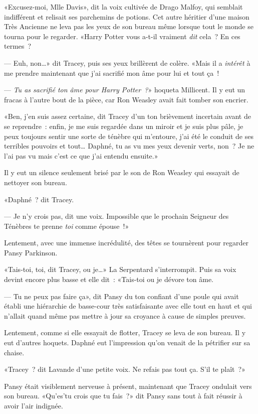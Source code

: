 «Excusez-moi, Mlle Davis», dit la voix cultivée de Drago Malfoy, qui semblait indifférent et relisait ses parchemins de potions. Cet autre héritier d'une maison Très Ancienne ne leva pas les yeux de son bureau même lorsque tout le monde se tourna pour le regarder. «Harry Potter vous a-t-il vraiment \emph{dit} cela~? En ces termes~?

--- Euh, non…» dit Tracey, puis ses yeux brillèrent de colère. «Mais il a \emph{intérêt} à me prendre maintenant que j'ai sacrifié mon âme pour lui et tout ça~!

--- \emph{Tu as sacrifié ton âme pour Harry Potter~?}» hoqueta Millicent. Il y eut un fracas à l'autre bout de la pièce, car Ron Weasley avait fait tomber son encrier.

«Ben, j'en suis assez certaine, dit Tracey d'un ton brièvement incertain avant de se reprendre~: enfin, je me suis regardée dans un miroir et je suis plus pâle, je peux toujours sentir une sorte de ténèbre qui m'entoure, j'ai été le conduit de ses terribles pouvoirs et tout… Daphné, tu as vu mes yeux devenir verts, non~? Je ne l'ai pas vu mais c'est ce que j'ai entendu ensuite.»

Il y eut un silence seulement brisé par le son de Ron Weasley qui essayait de nettoyer son bureau.

«Daphné~? dit Tracey.

--- Je n'y crois pas, dit une voix. Impossible que le prochain Seigneur des Ténèbres te prenne \emph{toi} comme épouse~!»

Lentement, avec une immense incrédulité, des têtes se tournèrent pour regarder Pansy Parkinson.

«Tais-toi, toi, dit Tracey, ou je…» La Serpentard s'interrompit. Puis sa voix devint encore plus basse et elle dit~: «Tais-toi ou je dévore ton âme.

--- Tu ne peux pas faire ça», dit Pansy du ton confiant d'une poule qui avait établi une hiérarchie de basse-cour très satisfaisante avec elle tout en haut et qui n'allait quand même pas mettre à jour sa croyance à cause de simples preuves.

Lentement, comme si elle essayait de flotter, Tracey se leva de son bureau. Il y eut d'autres hoquets. Daphné eut l'impression qu'on venait de la pétrifier sur sa chaise.

«Tracey~? dit Lavande d'une petite voix. Ne refais pas tout ça. S'il te plaît~?»

Pansy était visiblement nerveuse à présent, maintenant que Tracey ondulait vers son bureau. «Qu'es'tu crois que tu fais~?» dit Pansy sans tout à fait réussir à avoir l'air indignée.

